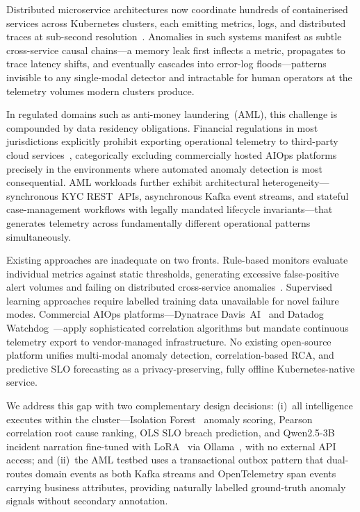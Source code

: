 \documentclass[a4paper]{lipics-v2021}
\begin{document}
Distributed microservice architectures now coordinate hundreds of containerised
services across Kubernetes clusters, each emitting metrics, logs, and distributed
traces at sub-second resolution~\cite{burns2016borg}. Anomalies in such systems
manifest as subtle cross-service causal chains---a memory leak first inflects a
metric, propagates to trace latency shifts, and eventually cascades into error-log
floods---patterns invisible to any single-modal detector and intractable for human
operators at the telemetry volumes modern clusters produce.

In regulated domains such as anti-money laundering~(AML), this challenge is
compounded by data residency obligations. Financial regulations in most
jurisdictions explicitly prohibit exporting operational telemetry to third-party
cloud services~\cite{kosinska2023toward}, categorically excluding commercially
hosted AIOps platforms precisely in the environments where automated anomaly
detection is most consequential. AML workloads further exhibit architectural
heterogeneity---synchronous KYC REST~APIs, asynchronous Kafka event streams, and
stateful case-management workflows with legally mandated lifecycle invariants---that
generates telemetry across fundamentally different operational patterns
simultaneously.

Existing approaches are inadequate on two fronts. Rule-based monitors evaluate
individual metrics against static thresholds, generating excessive false-positive
alert volumes and failing on distributed cross-service anomalies~\cite{soldani2022anomaly}.
Supervised learning approaches require labelled training data unavailable for
novel failure modes. Commercial AIOps platforms---Dynatrace Davis~AI~\cite{dynatrace2023}
and Datadog Watchdog~\cite{datadog2023}---apply sophisticated correlation algorithms
but mandate continuous telemetry export to vendor-managed infrastructure. No existing
open-source platform unifies multi-modal anomaly detection, correlation-based RCA,
and predictive SLO forecasting as a privacy-preserving, fully offline
Kubernetes-native service.

We address this gap with two complementary design decisions: (i)~all intelligence
executes within the cluster---Isolation Forest~\cite{liu2012isolation} anomaly
scoring, Pearson correlation root cause ranking, OLS SLO breach prediction, and
Qwen2.5-3B~\cite{qwen2024} incident narration fine-tuned with
LoRA~\cite{hu2022lora} via Ollama~\cite{ollama2023}, with no external API access;
and (ii)~the AML testbed uses a transactional outbox pattern that dual-routes
domain events as both Kafka streams and OpenTelemetry span events carrying business
attributes, providing naturally labelled ground-truth anomaly signals without
secondary annotation.
\end{document}
